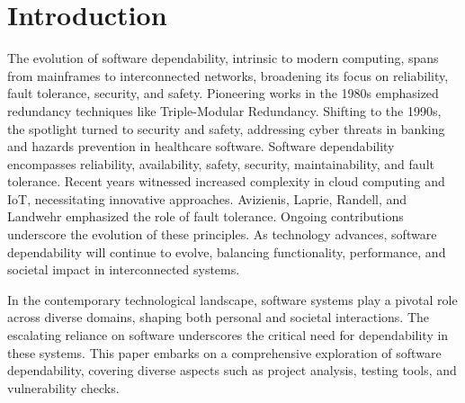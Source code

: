 \documentclass[sigconf]{acmart}
\begin{document}




\maketitle

\section{Introduction}
The evolution of software dependability, intrinsic to modern computing, spans from mainframes to interconnected networks, broadening its focus on reliability, fault tolerance, security, and safety. Pioneering works in the 1980s emphasized redundancy techniques like Triple-Modular Redundancy. Shifting to the 1990s, the spotlight turned to security and safety, addressing cyber threats in banking and hazards prevention in healthcare software. Software dependability encompasses reliability, availability, safety, security, maintainability, and fault tolerance. Recent years witnessed increased complexity in cloud computing and IoT, necessitating innovative approaches. Avizienis, Laprie, Randell, and Landwehr emphasized the role of fault tolerance. Ongoing contributions underscore the evolution of these principles. As technology advances, software dependability will continue to evolve, balancing functionality, performance, and societal impact in interconnected systems.

In the contemporary technological landscape, software systems play a pivotal role across diverse domains, shaping both personal and societal interactions. The escalating reliance on software underscores the critical need for dependability in these systems. This paper embarks on a comprehensive exploration of software dependability, covering diverse aspects such as project analysis, testing tools, and vulnerability checks.
\end{document}
